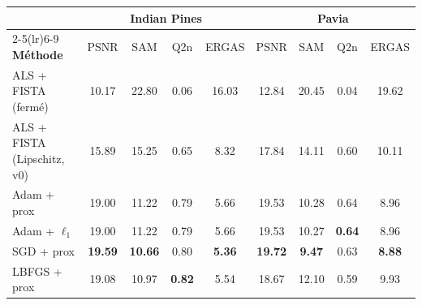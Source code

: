 \begin{tabular}{@{}lcccc@{\hskip 18pt}cccc@{}}
\toprule
 & \multicolumn{4}{c}{\textbf{Indian Pines}} & \multicolumn{4}{c}{\textbf{Pavia}} \\
\cmidrule(lr){2-5}\cmidrule(lr){6-9}
\textbf{Méthode} & PSNR & SAM & Q2n & ERGAS & PSNR & SAM & Q2n & ERGAS \\
\midrule
ALS + FISTA (fermé) & 10.17 & 22.80 & 0.06 & 16.03 & 12.84 & 20.45 & 0.04 & 19.62 \\
ALS + FISTA (Lipschitz, v0) & 15.89 & 15.25 & 0.65 & 8.32 & 17.84 & 14.11 & 0.60 & 10.11 \\
Adam + prox & 19.00 & 11.22 & 0.79 & 5.66 & 19.53 & 10.28 & 0.64 & 8.96 \\
Adam + $\ell_1$ & 19.00 & 11.22 & 0.79 & 5.66 & 19.53 & 10.27 & \textbf{0.64} & 8.96 \\
SGD + prox & \textbf{19.59} & \textbf{10.66} & 0.80 & \textbf{5.36} & \textbf{19.72} & \textbf{9.47} & 0.63 & \textbf{8.88} \\
LBFGS + prox & 19.08 & 10.97 & \textbf{0.82} & 5.54 & 18.67 & 12.10 & 0.59 & 9.93 \\
\bottomrule
\end{tabular}

